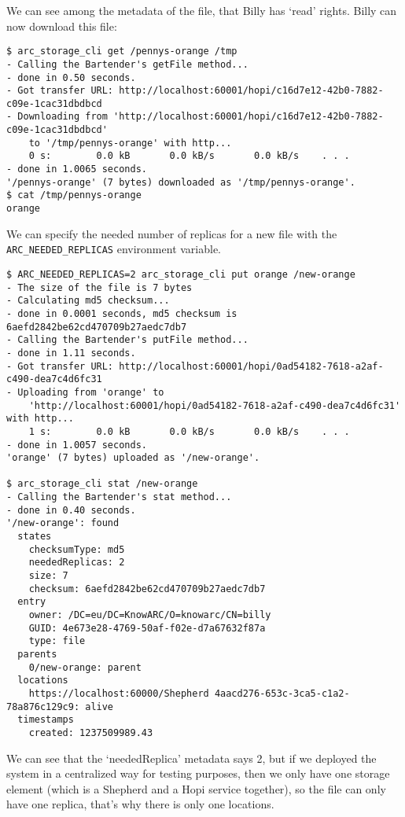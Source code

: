 \documentclass{book}
\begin{document}
We can see among the metadata of the file, that Billy has `read' rights. Billy can now download this file:

\begin{verbatim}
$ arc_storage_cli get /pennys-orange /tmp
- Calling the Bartender's getFile method...
- done in 0.50 seconds.
- Got transfer URL: http://localhost:60001/hopi/c16d7e12-42b0-7882-c09e-1cac31dbdbcd
- Downloading from 'http://localhost:60001/hopi/c16d7e12-42b0-7882-c09e-1cac31dbdbcd'
    to '/tmp/pennys-orange' with http...
    0 s:        0.0 kB       0.0 kB/s       0.0 kB/s    . . .       
- done in 1.0065 seconds.
'/pennys-orange' (7 bytes) downloaded as '/tmp/pennys-orange'.
$ cat /tmp/pennys-orange 
orange
\end{verbatim}

We can specify the needed number of replicas for a new file with the \verb!ARC_NEEDED_REPLICAS! environment variable.

\begin{verbatim}
$ ARC_NEEDED_REPLICAS=2 arc_storage_cli put orange /new-orange
- The size of the file is 7 bytes
- Calculating md5 checksum...
- done in 0.0001 seconds, md5 checksum is 6aefd2842be62cd470709b27aedc7db7
- Calling the Bartender's putFile method...
- done in 1.11 seconds.
- Got transfer URL: http://localhost:60001/hopi/0ad54182-7618-a2af-c490-dea7c4d6fc31
- Uploading from 'orange' to
    'http://localhost:60001/hopi/0ad54182-7618-a2af-c490-dea7c4d6fc31' with http...
    1 s:        0.0 kB       0.0 kB/s       0.0 kB/s    . . .       
- done in 1.0057 seconds.
'orange' (7 bytes) uploaded as '/new-orange'.

$ arc_storage_cli stat /new-orange
- Calling the Bartender's stat method...
- done in 0.40 seconds.
'/new-orange': found
  states
    checksumType: md5
    neededReplicas: 2
    size: 7
    checksum: 6aefd2842be62cd470709b27aedc7db7
  entry
    owner: /DC=eu/DC=KnowARC/O=knowarc/CN=billy
    GUID: 4e673e28-4769-50af-f02e-d7a67632f87a
    type: file
  parents
    0/new-orange: parent
  locations
    https://localhost:60000/Shepherd 4aacd276-653c-3ca5-c1a2-78a876c129c9: alive
  timestamps
    created: 1237509989.43

\end{verbatim}

We can see that the `neededReplica' metadata says 2, but if we deployed the system in a centralized way for testing purposes, then we only have one storage element (which is a Shepherd and a Hopi service together), so the file can only have one replica, that's why there is only one locations.
\end{document}
